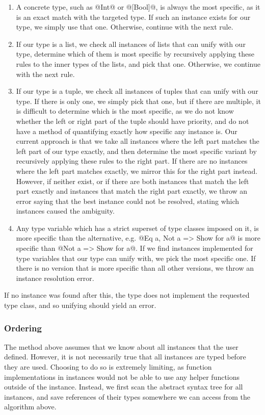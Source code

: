\begin{enumerate}
    \item A concrete type, such as @Int@ or @[Bool]@, is always the most specific, as it is an exact match with the targeted type. If such an instance exists for our type, we simply use that one. Otherwise, continue with the next rule.
    \item If our type is a list, we check all instances of lists that can unify with our type, determine which of them is most specific by recursively applying these rules to the inner types of the lists, and pick that one. Otherwise, we continue with the next rule.
    \item If our type is a tuple, we check all instances of tuples that can unify with our type. If there is only one, we simply pick that one, but if there are multiple, it is difficult to determine which is the most specific, as we do not know whether the left or right part of the tuple should have priority, and do not have a method of quantifying exactly how specific any instance is. Our current approach is that we take all instances where the left part matches the left part of our type exactly, and then determine the most specific variant by recursively applying these rules to the right part. If there are no instances where the left part matches exactly, we mirror this for the right part instead. However, if neither exist, or if there are both instances that match the left part exactly and instances that match the right part exactly, we throw an error saying that the best instance could not be resolved, stating which instances caused the ambiguity.
    \item Any type variable which has a strict superset of type classes imposed on it, is more specific than the alternative, e.g. @Eq a, Not a => Show for a@ is more specific than @Not a => Show for a@. If we find instances implemented for type variables that our type can unify with, we pick the most specific one. If there is no version that is more specific than all other versions, we throw an instance resolution error.
\end{enumerate}

If no instance was found after this, the type does not implement the requested type class, and so unifying should yield an error.

\subsubsection{Ordering}
The method above assumes that we know about all instances that the user defined. However, it is not necessarily true that all instances are typed before they are used. Choosing to do so is extremely limiting, as function implementations in instances would not be able to use any helper functions outside of the instance. Instead, we first scan the abstract syntax tree for all instances, and save references of their types somewhere we can access from the algorithm above.

